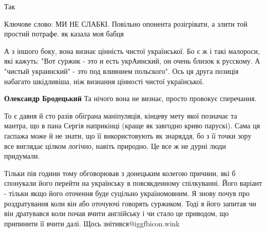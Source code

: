 \begin{itemize}
Так

 
Ключове слово: МИ НЕ СЛАБКІ. Повільно опонента розігрівати, а злити той простий потрафе. як казала моя бабця


А з іншого боку, вона визнає цінність чистої української. Бо є ж і такі
малороси, які кажуть: "Вот суржик - это и есть укрАинский, он очень близок к
русскому. А "чистый украинский" - это под влиянием польского". Ось ця друга
позиція набагато шкідливіша, ніж визнання цінності чистої української.

\begin{itemize}
 
\textbf{Олександр Бродецький}
Та нічого вона не визнає,
просто провокує сперечання.

 

То є давня й сто разів обіграна маніпуляція, кінцеву мету якої позначає та
мантра, що в пана Сергія наприкінці (краще як завгодно криво парускі). Сама ця
ґаспажа може й не знати, що її використовують як знаряддя, бо з її точки зору
все виглядає цілком логічно, навіть природно. Це все ж не дурні люди придумали.

\end{itemize}

 

Тільки пів години тому обговорював з донецьким колегою причини, які б спонукали
його перейти на українську в повсякденному спілкуванні. Його варіант - тільки
якщо його оточення буде суцільно україномовним. Я знову почув про роздратування
коли він або оточуючі говорять суржиком. Тоді я його запитав чи він дратувався
коли почав вчити англійську і чи стало це приводом, що припинити її вчити далі.
Щось знітився@igg{fbicon.wink}



\end{itemize}
